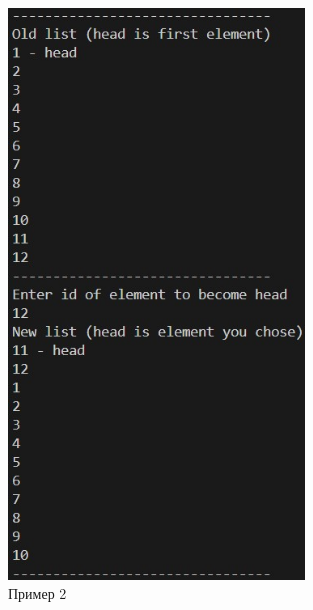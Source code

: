 \documentclass[a4paper,12pt]{report}
\begin{document}
\begin{figure}[ph]
    \includegraphics[width=0.7\textwidth]{ex2.jpg}
\caption{Пример 2}
\label{ris:image2}
\end{figure}
\end{document}

